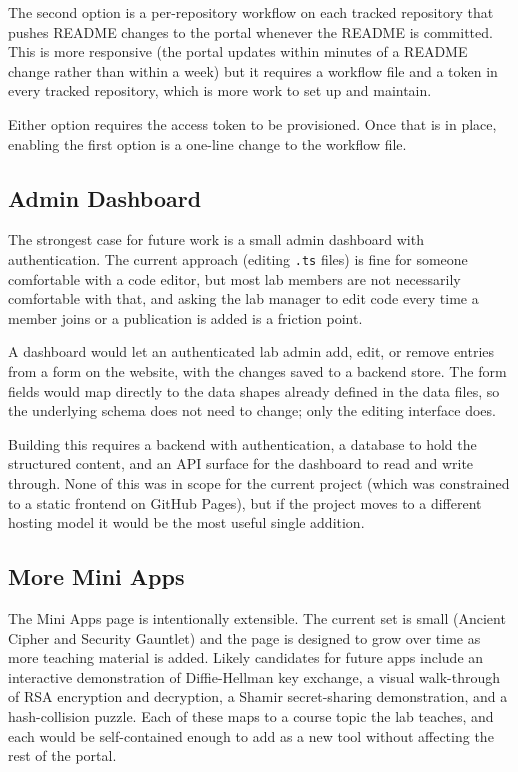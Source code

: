 The second option is a per-repository workflow on each tracked repository that pushes README changes to the portal whenever the README is committed. This is more responsive (the portal updates within minutes of a README change rather than within a week) but it requires a workflow file and a token in every tracked repository, which is more work to set up and maintain.

Either option requires the access token to be provisioned. Once that is in place, enabling the first option is a one-line change to the workflow file.

\subsection{Admin Dashboard}\label{subsec:challenges-admin}

The strongest case for future work is a small admin dashboard with authentication. The current approach (editing \texttt{.ts} files) is fine for someone comfortable with a code editor, but most lab members are not necessarily comfortable with that, and asking the lab manager to edit code every time a member joins or a publication is added is a friction point.

A dashboard would let an authenticated lab admin add, edit, or remove entries from a form on the website, with the changes saved to a backend store. The form fields would map directly to the data shapes already defined in the data files, so the underlying schema does not need to change; only the editing interface does.

Building this requires a backend with authentication, a database to hold the structured content, and an API surface for the dashboard to read and write through. None of this was in scope for the current project (which was constrained to a static frontend on GitHub Pages), but if the project moves to a different hosting model it would be the most useful single addition.

\subsection{More Mini Apps}\label{subsec:challenges-miniapps}

The Mini Apps page is intentionally extensible. The current set is small (Ancient Cipher and Security Gauntlet) and the page is designed to grow over time as more teaching material is added. Likely candidates for future apps include an interactive demonstration of Diffie-Hellman key exchange, a visual walk-through of RSA encryption and decryption, a Shamir secret-sharing demonstration, and a hash-collision puzzle. Each of these maps to a course topic the lab teaches, and each would be self-contained enough to add as a new tool without affecting the rest of the portal.

